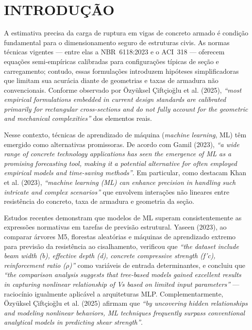 \documentclass[12pt,fleqn]{article}
\begin{document}
\section{INTRODUÇÃO}

A estimativa precisa da carga de ruptura em vigas de concreto armado é condição
fundamental para o dimensionamento seguro de estruturas civis. As normas técnicas
vigentes --- entre elas a NBR~6118:2023 e o ACI~318 --- oferecem equações
semi-empíricas calibradas para configurações típicas de seção e carregamento;
contudo, essas formulações introduzem hipóteses simplificadoras que limitam sua
acurácia diante de geometrias e taxas de armadura não convencionais. Conforme
observado por Özyüksel Çiftçioğlu et al. (2025), \textit{``most empirical
formulations embedded in current design standards are calibrated primarily for
rectangular cross-sections and do not fully account for the geometric and
mechanical complexities''} dos elementos reais.

Nesse contexto, técnicas de aprendizado de máquina (\textit{machine learning},
ML) têm emergido como alternativas promissoras. De acordo com Gamil (2023),
\textit{``a wide range of concrete technology applications has seen the emergence
of ML as a promising forecasting tool, making it a potential alternative for
often employed empirical models and time-saving methods''}. Em particular, como
destacam Khan et al. (2023), \textit{``machine learning (ML) can enhance
precision in handling such intricate and complex scenarios''} que envolvem
interações não lineares entre resistência do concreto, taxa de armadura e
geometria da seção.

Estudos recentes demonstram que modelos de ML superam consistentemente as
expressões normativas em tarefas de previsão estrutural. Yaseen (2023), ao
comparar árvores M5, florestas aleatórias e máquinas de aprendizado extremo para
previsão da resistência ao cisalhamento, verificou que \textit{``the dataset
include beam width (b), effective depth (d), concrete compressive strength
(f'c), reinforcement ratio ($\rho$)''} como variáveis de entrada determinantes,
e concluiu que \textit{``the comparison analysis suggests that tree-based models
gained excellent results in capturing nonlinear relationship of Vs based on
limited input parameters''} --- raciocínio igualmente aplicável a arquiteturas
MLP. Complementarmente, Özyüksel Çiftçioğlu et al. (2025) afirmam que \textit{``by
uncovering hidden relationships and modeling nonlinear behaviors, ML techniques
frequently surpass conventional analytical models in predicting shear strength''}.
\end{document}
